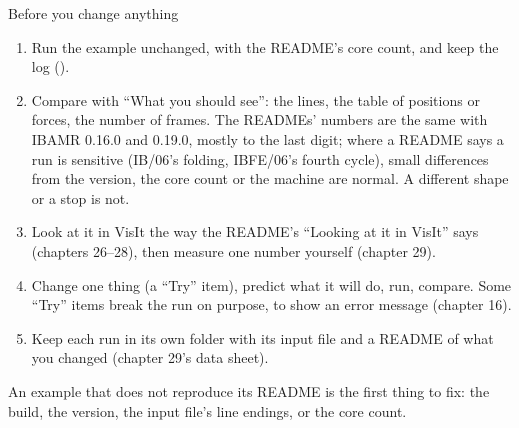 \documentclass[aspectratio=169,11pt]{beamer}
\begin{document}
\begin{frame}{Before you change anything}
\label{fr:before}
\footnotesize
\begin{enumerate}\setlength{\itemsep}{2pt}
  \item Run the example unchanged, with the README's core count, and keep the log ().
  \item Compare with ``What you should see'': the  lines, the table of positions or forces, the number of frames. The READMEs' numbers are the same with IBAMR 0.16.0 and 0.19.0, mostly to the last digit; where a README says a run is sensitive (IB/06's folding, IBFE/06's fourth cycle), small differences from the version, the core count or the machine are normal. A different shape or a stop is not.
  \item Look at it in VisIt the way the README's ``Looking at it in VisIt'' says (chapters 26--28), then measure one number yourself (chapter 29).
  \item Change one thing (a ``Try'' item), predict what it will do, run, compare. Some ``Try'' items break the run on purpose, to show an error message (chapter 16).
  \item Keep each run in its own folder with its input file and a README of what you changed (chapter 29's data sheet).
\end{enumerate}
\begin{punchbox}
\small An example that does not reproduce its README is the first thing to fix: the build, the version, the input file's line endings, or the core count.
\end{punchbox}
\end{frame}
\end{document}
